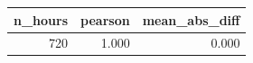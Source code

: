 \begin{tabular}{rrr}
\toprule
n_hours & pearson & mean_abs_diff \\
\midrule
720 & 1.000 & 0.000 \\
\bottomrule
\end{tabular}
